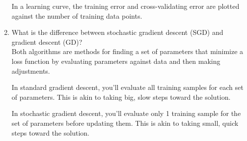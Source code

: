 \documentclass[11pt]{article}
\begin{document}
\begin{enumerate}
In a learning curve, the training error and cross-validating error are plotted against the number
of training data points.

\item What is the difference between stochastic gradient descent (SGD) and
gradient descent (GD)?\\[.5em]
Both algorithms are methods for finding a set of parameters that minimize a loss function by
evaluating parameters against data and then making adjustments.

In standard gradient descent, you'll evaluate all training samples for each set of parameters.
This is akin to taking big, slow steps toward the solution.

In stochastic gradient descent, you'll evaluate only 1 training sample for the set of parameters
before updating them. This is akin to taking small, quick steps toward the solution.
\end{enumerate}
\pagebreak
\end{document}
